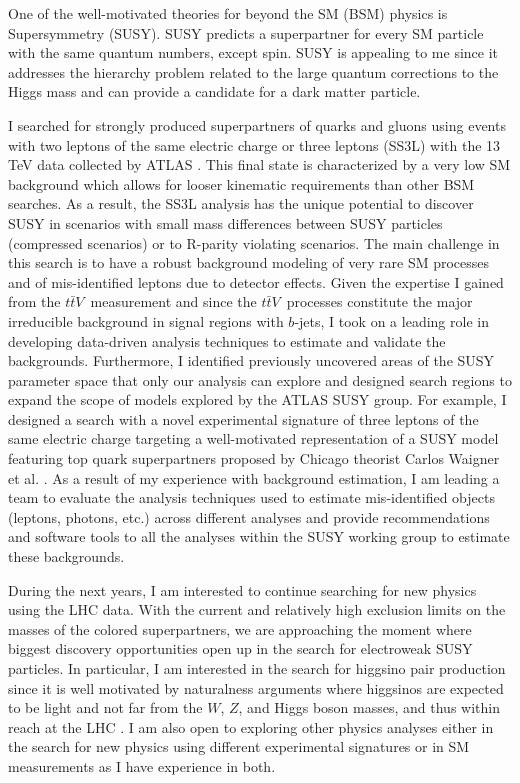 \documentclass[a4paper]{article}
\newcommand{\ttbarV}{\ensuremath{t\bar{t}V}}
\begin{document}
One of the well-motivated theories for beyond the SM (BSM) physics is Supersymmetry (SUSY). SUSY predicts a superpartner
for every SM particle with the same quantum numbers, except spin. SUSY is appealing to me since it addresses the hierarchy problem related
to the large quantum corrections to the Higgs mass and can provide a candidate for a dark matter particle.

I searched for strongly
produced superpartners of quarks and gluons using events with two leptons of the same electric
charge or three leptons (SS3L) with the 13 TeV data collected by ATLAS
\cite{conf-2015-SS3L,paper-2015-SS3L,conf-2016-SS3L}.
This final state is characterized by a very low SM background
which allows for looser kinematic requirements than other BSM searches. As a result, the SS3L analysis has the unique potential to discover SUSY
in scenarios with small mass differences between SUSY particles (compressed scenarios) or to R-parity violating scenarios.
The main challenge in this search is to have a robust background modeling of very rare SM processes and
of mis-identified leptons due to detector effects. Given the expertise I gained from the \ttbarV~measurement and since the \ttbarV~processes constitute
the major irreducible background in signal regions with $b$-jets, I took on a leading role in developing data-driven analysis techniques
to estimate and validate the backgrounds. Furthermore, I identified previously uncovered areas of the SUSY parameter space that only our analysis
can explore and designed search regions to expand the scope of models explored by the ATLAS SUSY group.
For example, I designed a search with a novel experimental signature of three leptons of the same electric
charge targeting a well-motivated representation of a SUSY model featuring top quark superpartners proposed by Chicago theorist
Carlos Waigner et al. \cite{stop_3lss}.
As a result of my experience with background estimation, I am leading a team to evaluate the analysis techniques used to estimate
mis-identified objects (leptons, photons, etc.) across different analyses and provide recommendations and software tools to all
the analyses within the SUSY working group to estimate these backgrounds.

During the next years, I am interested to continue searching for new physics using the LHC data.
 With the current and relatively high exclusion limits on the masses of the colored superpartners,
we are approaching the moment where biggest discovery opportunities open up in the search for electroweak SUSY particles.
In particular, I am interested in the search for higgsino pair production since it is well motivated by naturalness arguments where
higgsinos are expected to be light and not far from the $W$, $Z$, and Higgs boson masses, and thus within reach at the LHC \cite{natural}.
I am also open to exploring other physics analyses either in the search for new physics using different experimental signatures or in SM measurements
as I have experience in both.
\end{document}
